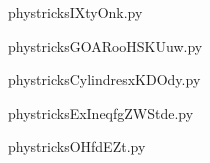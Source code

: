     

    \clearpage
    


    \newcommand{\CaptionFigIXtyOnk}{<+Type your caption here+>}
    \begin{center}
        
    \end{center}
    phystricksIXtyOnk.py

    

    \clearpage
    


    \newcommand{\CaptionFigGOARooHSKUuw}{<+Type your caption here+>}
    \begin{center}
        
    \end{center}
    phystricksGOARooHSKUuw.py

    

    \clearpage
    


    \newcommand{\CaptionFigCylindresxKDOdy}{<+Type your caption here+>}
    \begin{center}
        
    \end{center}
    phystricksCylindresxKDOdy.py

    

    \clearpage
    


    \newcommand{\CaptionFigExIneqfgZWStde}{<+Type your caption here+>}
    \begin{center}
        
    \end{center}
    phystricksExIneqfgZWStde.py

    

    \clearpage
    


    \newcommand{\CaptionFigOHfdEZt}{<+Type your caption here+>}
    \begin{center}
        
    \end{center}
    phystricksOHfdEZt.py

    

    \clearpage
    


